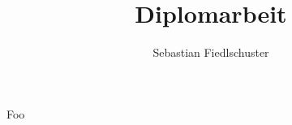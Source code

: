 \documentclass[a4paper]{article}
\title{Diplomarbeit}
\author{Sebastian Fiedlschuster}
\begin{document}
  \maketitle

  
  
  

  Foo \cite{mueller2000}
  \printbibliography
\end{document}
